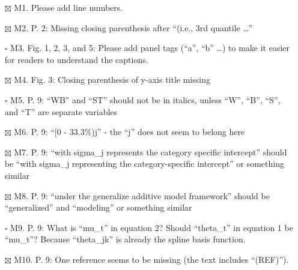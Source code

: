 \documentclass[
]{article}
\begin{document}
\begin{itemize}
\item[$\boxtimes$]
  M1. Please add line numbers.
\item[$\boxtimes$]
  M2. P. 2: Missing closing parenthesis after ``(i.e., 3rd quantile
  \ldots{}''
\item[$\square$]
  M3. Fig. 1, 2, 3, and 5: Please add panel tags (``a'', ``b'' \ldots)
  to make it easier for readers to understand the captions.
\item[$\boxtimes$]
  M4. Fig. 3: Closing parenthesis of y-axis title missing
\item[$\square$]
  M5. P. 9: ``WB'' and ``ST'' should not be in italics, unless ``W'',
  ``B'', ``S'', and ``T'' are separate variables
\item[$\boxtimes$]
  M6. P. 9: ``{[}0 - 33.3\(\%\))j'' - the ``j'' does not seem to belong
  here
\item[$\boxtimes$]
  M7. P. 9: ``with sigma\_j represents the category specific intercept''
  should be ``with sigma\_j representing the category-specific
  intercept'' or something similar
\item[$\boxtimes$]
  M8. P. 9: ``under the generalize additive model framework'' should be
  ``generalized'' and ``modeling'' or something similar
\item[$\square$]
  M9. P. 9: What is ``mu\_t'' in equation 2? Should ``theta\_t'' in
  equation 1 be ``mu\_t''? Because ``theta\_jk'' is already the spline
  basis function.
\item[$\boxtimes$]
  M10. P. 9: One reference seems to be missing (the text includes
  ``(REF)'').
\end{itemize}
\end{document}
